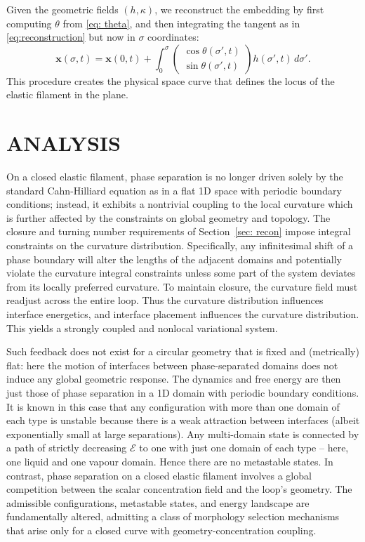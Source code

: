 \documentclass[
aip,
jcp,
reprint, 
floatfix
]{revtex4-1}
\begin{document}
Given the geometric fields $(h,\kappa)$, we reconstruct the embedding by first computing $\theta$ from
\eqref{eq: theta}, and then integrating the tangent as in \eqref{eq:reconstruction} but now in $\sigma$ coordinates:
\begin{equation}
\mathbf{x}(\sigma,t)
=
\mathbf{x}(0,t)
+\int_{0}^{\sigma}
\begin{pmatrix}
\cos\theta(\sigma',t)\\[2pt]
\sin\theta(\sigma',t)
\end{pmatrix}
h(\sigma',t)\,d\sigma' .
\label{eq:reconstruction_sigma}
\end{equation}
This procedure creates the physical space curve that defines the locus of the elastic filament in the plane. 



\section{ANALYSIS} \label{sec: analysis}

On a closed elastic filament, phase separation is no longer driven solely by the standard Cahn-Hilliard equation as in a flat 1D space with periodic boundary conditions; instead, it exhibits a nontrivial coupling to the local curvature which is further affected by the constraints on global geometry and topology. The closure and turning number requirements of Section~\ref{sec: recon} impose integral constraints on the curvature distribution. Specifically, any infinitesimal shift of a phase boundary will alter the lengths of the adjacent domains and potentially violate the curvature integral constraints unless some part of the system deviates from its locally preferred curvature. To maintain closure, the curvature field must readjust across the entire loop. Thus the curvature distribution influences interface energetics, and interface placement influences the curvature distribution. This yields a strongly coupled and nonlocal variational system. 

Such feedback does not exist for a circular geometry that is fixed and (metrically) flat: here the motion of interfaces between phase-separated domains does not induce any global geometric response. The dynamics and free energy are then just those of phase separation in a 1D domain with periodic boundary conditions. It is known in this case that any configuration with more than one domain of each type is unstable because there is a weak attraction between interfaces (albeit exponentially small at large separations). Any multi-domain state is connected by a path of strictly decreasing $\mathcal{E}$ to one with just one domain of each type -- here, one liquid and one vapour domain. Hence there are no metastable states.
In contrast, phase separation on a closed elastic filament involves a global competition between the scalar concentration field and the loop's geometry. The admissible configurations, metastable states, and energy landscape are fundamentally altered, admitting a class of morphology selection mechanisms that arise only for a closed curve with geometry-concentration coupling. 
\end{document}
